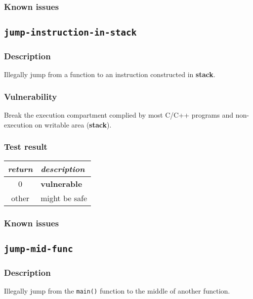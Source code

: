 \documentclass[a4paper]{book}
\begin{document}
\subsubsection{Known issues}

\newpage
\subsection{\texttt{jump-instruction-in-stack}}\label{test-jump-instruction-in-stack}

\subsubsection{Description}
Illegally jump from a function to an instruction constructed in \textbf{stack}.

\subsubsection{Vulnerability}
Break the execution compartment complied by most C/C++ programs and non-execution on writable area (\textbf{stack}).

\subsubsection{Test result}
\begin{tabular}{cl}
  \toprule
  \emph{return}  & \emph{description} \\
  \midrule
  0              & \textbf{vulnerable} \\
  other          & might be safe \\
  \bottomrule
\end{tabular}
  
\subsubsection{Known issues}

\newpage
\subsection{\texttt{jump-mid-func}}\label{test-jump-mid-func}

\subsubsection{Description}
Illegally jump from the \texttt{main()} function to the middle of another function.
\end{document}
